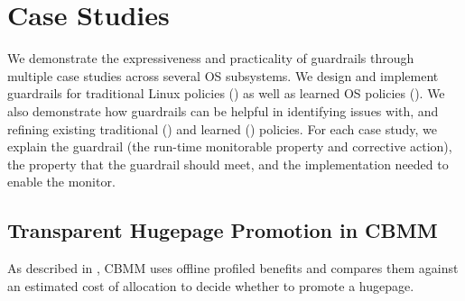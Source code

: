 \section{Case Studies}\label{sec:case-studies}

We demonstrate the expressiveness and practicality of guardrails through multiple case studies across several OS subsystems.
We design and implement guardrails for traditional Linux policies () as well as learned OS policies (). We also demonstrate how guardrails can be helpful in identifying issues with, and refining existing traditional () and learned () policies.
For each case study, we explain the guardrail (the run-time monitorable property and corrective action), the \perfsafety property  that the guardrail should meet, and the implementation needed to enable the monitor.

\subsection{Transparent Hugepage Promotion in CBMM}
\label{subsec:cbmm-case-study}

As described in , CBMM uses offline profiled benefits and compares them against an estimated cost of allocation to decide whether to promote a hugepage. 


